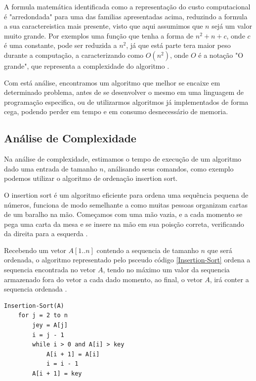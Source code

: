 \documentclass[
	12pt,				%
	openright,			%
	oneside,			%
	a4paper,			%
	english,			%
	brazil				%
	]{abntex2}
\begin{document}
A formula matemática identificada como a representação do custo computacional é "arredondada" para uma das familias
apresentadas acima, reduzindo a formula a sua caractereistica mais presente, visto que aqui assumimos que $n$ sejá
um valor muito grande. Por exemplos uma função que tenha a forma de $n^2 + n + c$, onde $c$ é uma constante, 
pode ser reduzida a $n^2$, já que está parte tera maior peso durante a computação, a caracterizando 
como $O(n^2)$, onde $O$ é a notação "O grande", que representa a complexidade do algoritmo \cite{introductionAlgorthms}.

Com está análise, encontramos um algoritmo que melhor se encaixe em determinado problema, antes de se
desenvolver o mesmo em uma linguagem de programação especifica, ou de utilizarmos algoritmos já implementados de forma
cega, podendo perder em tempo e em consumo desnecessário de memoria.

\subsection{Análise de Complexidade}

Na análise de complexidade, estimamos o tempo de execução de um algoritmo dado uma entrada de tamanho $n$, análisando 
seus comandos, como exemplo podemos utilizar o algoritmo de ordenação insertion sort. 

O insertion sort é um algoritmo eficiente para ordena uma sequência pequena de números, funciona de modo semelhante a
como muitas pessoas organizam cartas de um baralho na mão. Começamos com uma mão vazia, e a cada momento se pega uma
carta da mesa e se insere na mão em sua poisção correta, verificando da direita para a esquerda \cite{introductionAlgorthms}.

Recebendo um vetor $A[1..n]$ contendo a sequencia de tamanho $n$ que será ordenada,  o algoritmo representado pelo
psceudo código \ref{Insertion-Sort} ordena a sequencia encontrada no vetor $A$, tendo no máximo um valor da sequencia 
armazenado fora do vetor a cada dado momento, ao final, o vetor $A$, irá conter a sequencia ordenada \cite{introductionAlgorthms}.

\lstset{style=psceudo}
\begin{lstlisting}[caption={\label{Insertion-Sort}Insertion-Sort}]
	Insertion-Sort(A)
	for j = 2 to n
		jey = A[j]
		i = j - 1
		while i > 0 and A[i] > key
			A[i + 1] = A[i]
			i = i - 1
		A[i + 1] = key	
\end{lstlisting}
\end{document}
